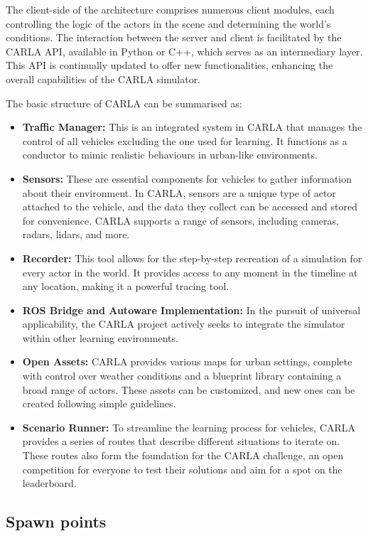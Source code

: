 The client-side of the architecture comprises numerous client modules, each controlling the logic of the actors in the scene and determining the world's conditions. The interaction between the server and client is facilitated by the CARLA API, available in Python or C++, which serves as an intermediary layer. This API is continually updated to offer new functionalities, enhancing the overall capabilities of the CARLA simulator.

The basic structure of CARLA can be summarised as:

\begin{itemize}
\item \textbf{Traffic Manager:} This is an integrated system in CARLA that manages the control of all vehicles excluding the one used for learning. It functions as a conductor to mimic realistic behaviours in urban-like environments.
\item \textbf{Sensors:} These are essential components for vehicles to gather information about their environment. In CARLA, sensors are a unique type of actor attached to the vehicle, and the data they collect can be accessed and stored for convenience. CARLA supports a range of sensors, including cameras, radars, lidars, and more.
\item \textbf{Recorder:} This tool allows for the step-by-step recreation of a simulation for every actor in the world. It provides access to any moment in the timeline at any location, making it a powerful tracing tool.
\item \textbf{ROS Bridge and Autoware Implementation:} In the pursuit of universal applicability, the CARLA project actively seeks to integrate the simulator within other learning environments.
\item \textbf{Open Assets:} CARLA provides various maps for urban settings, complete with control over weather conditions and a blueprint library containing a broad range of actors. These assets can be customized, and new ones can be created following simple guidelines.
\item \textbf{Scenario Runner:} To streamline the learning process for vehicles, CARLA provides a series of routes that describe different situations to iterate on. These routes also form the foundation for the CARLA challenge, an open competition for everyone to test their solutions and aim for a spot on the leaderboard.
\end{itemize}

\subsection{Spawn points}

